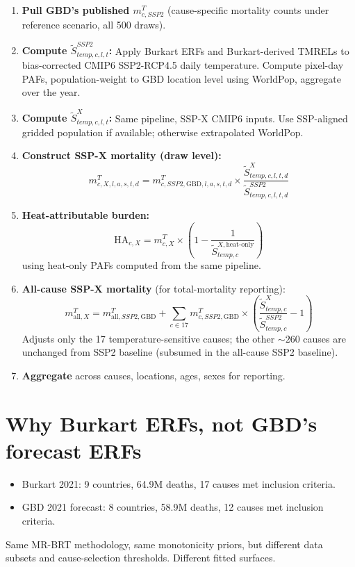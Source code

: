 \documentclass[11pt]{article}
\begin{document}
\begin{enumerate}
\item \textbf{Pull GBD's published $m^T_{c,SSP2}$} (cause-specific mortality counts under reference scenario, all 500 draws).
\item \textbf{Compute $\tilde{S}^{SSP2}_{temp,c,l,t}$:} Apply Burkart ERFs and Burkart-derived TMRELs to bias-corrected CMIP6 SSP2-RCP4.5 daily temperature. Compute pixel-day PAFs, population-weight to GBD location level using WorldPop, aggregate over the year.
\item \textbf{Compute $\tilde{S}^X_{temp,c,l,t}$:} Same pipeline, SSP-X CMIP6 inputs. Use SSP-aligned gridded population if available; otherwise extrapolated WorldPop.
\item \textbf{Construct SSP-X mortality (draw level):}
  \begin{equation}
  m^T_{c,X,l,a,s,t,d} = m^T_{c,SSP2,\text{GBD},l,a,s,t,d} \times \frac{\tilde{S}^X_{temp,c,l,t,d}}{\tilde{S}^{SSP2}_{temp,c,l,t,d}}
  \end{equation}
\item \textbf{Heat-attributable burden:}
  \begin{equation}
  \text{HA}_{c,X} = m^T_{c,X} \times \left(1 - \frac{1}{\tilde{S}^{X,\text{heat-only}}_{temp,c}}\right)
  \end{equation}
  using heat-only PAFs computed from the same pipeline.
\item \textbf{All-cause SSP-X mortality} (for total-mortality reporting):
  \begin{equation}
  m^T_{\text{all},X} = m^T_{\text{all},SSP2,\text{GBD}} + \sum_{c \in 17} m^T_{c,SSP2,\text{GBD}} \times \left(\frac{\tilde{S}^X_{temp,c}}{\tilde{S}^{SSP2}_{temp,c}} - 1\right)
  \end{equation}
  Adjusts only the 17 temperature-sensitive causes; the other ${\sim}260$ causes are unchanged from SSP2 baseline (subsumed in the all-cause SSP2 baseline).
\item \textbf{Aggregate} across causes, locations, ages, sexes for reporting.
\end{enumerate}

\section{Why Burkart ERFs, not GBD's forecast ERFs}

\begin{itemize}
\item Burkart 2021: 9 countries, 64.9M deaths, 17 causes met inclusion criteria.
\item GBD 2021 forecast: 8 countries, 58.9M deaths, 12 causes met inclusion criteria.
\end{itemize}
Same MR-BRT methodology, same monotonicity priors, but different data subsets and cause-selection thresholds. Different fitted surfaces.
\end{document}
